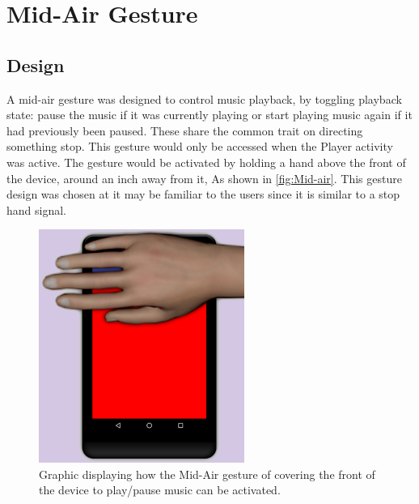 \documentclass{l4proj}
\begin{document}
\section{Mid-Air Gesture}

\subsection{Design}
A mid-air gesture was designed to control music playback, by toggling playback state: pause the music if it was currently playing or start playing music again if it had previously been paused. These share the common trait on directing something stop. This gesture would only be accessed when the Player activity was active. The gesture would be activated by holding a hand above the front of the device, around an inch away from it, As shown in \autoref{fig:Mid-air}. This gesture design was chosen at it may be familiar to the users since it is similar to a stop hand signal.

\begin{figure}
    \centering
    \includegraphics[width=0.6\textwidth]{images/covering.png}
        \caption{Graphic displaying how the Mid-Air gesture of covering the front of the device to play/pause music can be activated.}
        \label{fig:Mid-air}
\end{figure}
\end{document}
